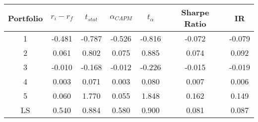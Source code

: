 \begin{tabular}{ccccccc}
\toprule
Portfolio & $r_i - r_f$ & $t_{stat}$ & $\alpha_{CAPM}$ & $t_{\alpha}$ & Sharpe Ratio & IR \\
\midrule
1 & -0.481 & -0.787 & -0.526 & -0.816 & -0.072 & -0.079 \\
2 & 0.061 & 0.802 & 0.075 & 0.885 & 0.074 & 0.092 \\
3 & -0.010 & -0.168 & -0.012 & -0.226 & -0.015 & -0.019 \\
4 & 0.003 & 0.071 & 0.003 & 0.080 & 0.007 & 0.006 \\
5 & 0.060 & 1.770 & 0.055 & 1.848 & 0.162 & 0.149 \\
LS & 0.540 & 0.884 & 0.580 & 0.900 & 0.081 & 0.087 \\
\bottomrule
\end{tabular}
